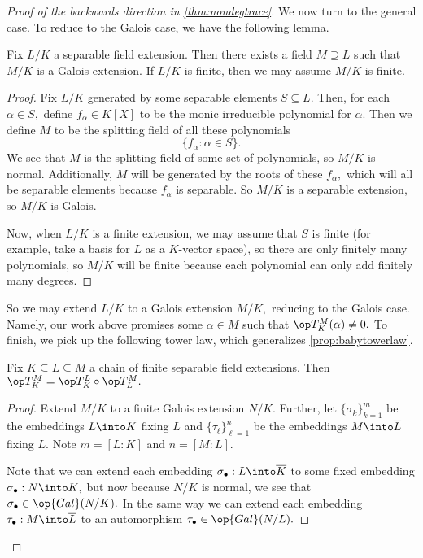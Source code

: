 \begin{proof}[Proof of the backwards direction in \autoref{thm:nondegtrace}]
	We now turn to the general case. To reduce to the Galois case, we have the following lemma.
	\begin{lemma}
		Fix $L/K$ a separable field extension. Then there exists a field $M\supseteq L$ such that $M/K$ is a Galois extension. If $L/K$ is finite, then we may assume $M/K$ is finite.
	\end{lemma}
	\begin{proof}
		Fix $L/K$ generated by some separable elements $S\subseteq L.$ Then, for each $\alpha\in S,$ define $f_\alpha\in K[X]$ to be the monic irreducible polynomial for $\alpha.$ Then we define $M$ to be the splitting field of all these polynomials
		\[\{f_\alpha:\alpha\in S\}.\]
		We see that $M$ is the splitting field of some set of polynomials, so $M/K$ is normal. Additionally, $M$ will be generated by the roots of these $f_\alpha,$ which will all be separable elements because $f_\alpha$ is separable. So $M/K$ is a separable extension, so $M/K$ is Galois.

		Now, when $L/K$ is a finite extension, we may assume that $S$ is finite (for example, take a basis for $L$ as a $K$-vector space), so there are only finitely many polynomials, so $M/K$ will be finite because each polynomial can only add finitely many degrees.
	\end{proof}
	So we may extend $L/K$ to a Galois extension $M/K,$ reducing to the Galois case. Namely, our work above promises some $\alpha\in M$ such that $\op T^M_K(\alpha)\ne0.$ To finish, we pick up the following tower law, which generalizes \autoref{prop:babytowerlaw}.
	\begin{lemma} \label{lem:tracetower}
		Fix $K\subseteq L\subseteq M$ a chain of finite separable field extensions. Then $\op T^M_K=\op T^L_K\circ\op T^M_L.$
	\end{lemma}
	\begin{proof}
		Extend $M/K$ to a finite Galois extension $N/K.$ Further, let $\{\sigma_k\}_{k=1}^m$ be the embeddings $L\into\overline K$ fixing $L$ and $\{\tau_\ell\}_{\ell=1}^n$ be the embeddings $M\into\overline L$ fixing $L.$ Note $m=[L:K]$ and $n=[M:L].$
		
		Note that we can extend each embedding $\sigma_\bullet:L\into\overline K$ to some fixed embedding $\sigma_\bullet:N\into\overline K,$ but now because $N/K$ is normal, we see that $\sigma_\bullet\in\op{Gal}(N/K).$ In the same way we can extend each embedding $\tau_\bullet:M\into\overline L$ to an automorphism $\tau_\bullet\in\op{Gal}(N/L).$


\end{proof}
\end{proof}
